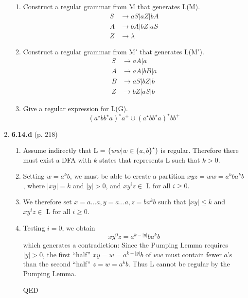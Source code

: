 \documentclass[12pt]{article}
\begin{document}
\begin{enumerate}
\begin{enumerate}
  \item Construct a regular grammar from M that generates L(M). 
    \begin{align*}
      S &\rightarrow aS|aZ|bA \\
      A &\rightarrow bA|bZ|aS \\
      Z &\rightarrow \lambda 
    \end{align*}
  \item Construct a regular grammar from M$'$ that generates L(M$'$).
    \begin{align*}
      S &\rightarrow aA|a \\
      A &\rightarrow aA|bB|a \\
      B &\rightarrow aS|bZ|b \\
      Z &\rightarrow bZ|aS|b 
    \end{align*}
  \item Give a regular expression for L(G).
    \[(a^{\star}bb^{\star}a)^{\star}a^+
      \cup (a^{\star}bb^{\star}a)^{\star}bb^+ \]
  \end{enumerate}

\newpage

\item \textbf{6.14.d} (p. 218)
  \begin{enumerate}
    \item Assume indirectly that L = $\{ww | w \in \{a,b\}^{\star}\}$
      is regular. Therefore there must exist a DFA with $k$ states
      that represents L such that $k > 0$.
    \item Setting $w = a^kb$, we must be able to create a partition
      $xyz = ww = a^kba^kb$, where $|xy| = k$ and $|y| > 0$, and
      $xy^iz \in $ L for all $i \ge 0$.
    \item We therefore set $x = a \ldots a, y = a \ldots a, z =
      ba^kb$ such that $|xy| \le k$ and $xy^iz \in $ L for all $i \ge 0$.
    \item Testing $i = 0$, we obtain 
      \[ xy^0z = a^{k-|y|}ba^kb \]
      which generates a contradiction: Since the Pumping Lemma
      requires $|y| > 0$, the first ``half'' $xy = w = a^{k-|y|}b$ of $ww$
      must contain fewer $a$'s than the second ``half'' $z = w =
      a^kb$. Thus L cannot be regular by the Pumping Lemma.
      \begin{center} QED \end{center}
  \end{enumerate}


\end{enumerate}
\end{document}
